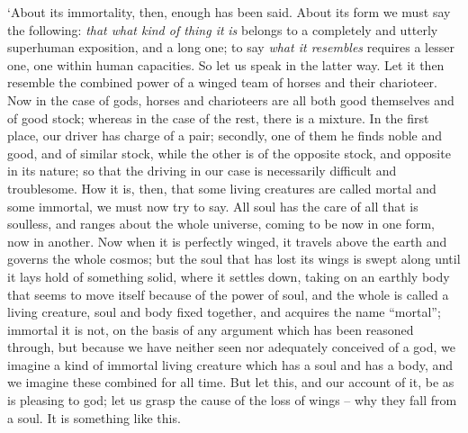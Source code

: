 ‘About its immortality, then, enough has been said. About its form we
must say the following: {\em that what kind of thing it} 
{\em is} belongs to a completely and utterly
superhuman exposition,
and a long one; to say {\em what it resembles} requires a lesser one,
one within human capacities. So let us speak in the latter way. Let it
then resemble the
combined power of a
winged team of horses and their charioteer. Now in the case of gods,
horses  and charioteers are all both good themselves and of good
stock; whereas in the case of the rest, there is a mixture. In the first
place, our driver has
charge of a pair; secondly, one of them he finds noble and good, and of
similar stock, while the other is of the opposite stock, and opposite in
its nature; so that the  driving in our case is necessarily
difficult and troublesome. How it is, then, that some living creatures
are called mortal and some immortal, we must now try to say. All soul
has the care of all that is soulless, and ranges about the whole
universe, coming  to be now in one form, now in another. Now
when it is perfectly winged, it travels above the earth and governs the
whole cosmos; but the soul that has lost its wings is swept along until
it lays hold of something solid, where it settles down, taking on an
earthly body that seems to move itself because of the power of
soul, and the whole is called a living creature, soul and body fixed
together, and acquires the name “mortal”; immortal it is not, on the
basis of any argument which has been reasoned through, but because we
have neither seen nor adequately  conceived of a god, we imagine
a kind of immortal living creature which has a soul and has a body, and
we imagine these combined for all time. But let this, and our account of
it, be as is pleasing to
god; let us grasp the
cause of the loss of wings --  why they fall from a soul. It is
something like this.


